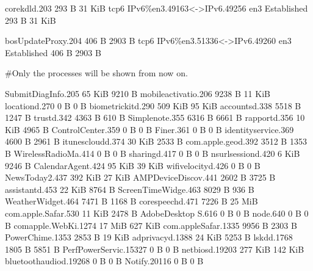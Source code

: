 \documentclass[a4paper, 12pt]{report}
\theoremstyle{remark}
\theoremstyle{definition}
\begin{document}
\begin{python}
corekdld.203                                            293 B     31 KiB
tcp6 IPv6\%en3.49163<->IPv6.49256 en3 Established       293 B     31 KiB

bosUpdateProxy.204                                      406 B     2903 B
tcp6 IPv6\%en3.51336<->IPv6.49260 en3 Established       406 B     2903 B

#Only the processes will be shown from now on. 

SubmitDiagInfo.205                                    65 KiB        9210 B
mobileactivatio.206                                   9238 B        11 KiB
locationd.270                                            0 B           0 B
biometrickitd.290                                    509 KiB        95 KiB
accountsd.338                                         5518 B        1247 B
trustd.342                                            4363 B         610 B
Simplenote.355                                        6316 B        6661 B
rapportd.356                                          10 KiB        4965 B
ControlCenter.359                                        0 B           0 B
Finer.361                                                0 B           0 B
identityservice.369                                   4600 B        2961 B
itunescloudd.374                                      30 KiB        2533 B
com.apple.geod.392                                    3512 B        1353 B
WirelessRadioMa.414                                      0 B           0 B
sharingd.417                                             0 B           0 B
nsurlsessiond.420                                      6 KiB        9246 B
CalendarAgent.424                                     95 KiB        39 KiB
wifivelocityd.426                                        0 B           0 B
NewsToday2.437                                       392 KiB        27 KiB
AMPDeviceDiscov.441                                   2602 B        3725 B
assistantd.453                                        22 KiB        8764 B
ScreenTimeWidge.463                                   8029 B         936 B
WeatherWidget.464                                     7471 B        1168 B
corespeechd.471                                       7226 B        25 MiB
com.apple.Safar.530                                   11 KiB        2478 B
AdobeDesktop S.616                                       0 B           0 B
node.640                                                 0 B           0 B
comapple.WebKi.1274                                   17 MiB       627 KiB
com.appleSafar.1335                                   9956 B        2303 B
PowerChime.1353                                       2853 B        19 KiB
adprivacyd.1388                                       24 KiB        5253 B
lskdd.1768                                            1805 B        5851 B
PerfPowerServic.15327                                    0 B           0 B
netbiosd.19203                                       277 KiB       142 KiB
bluetoothaudiod.19268                                    0 B           0 B
Notify.20116                                             0 B           0 B
\end{python}
\end{document}
